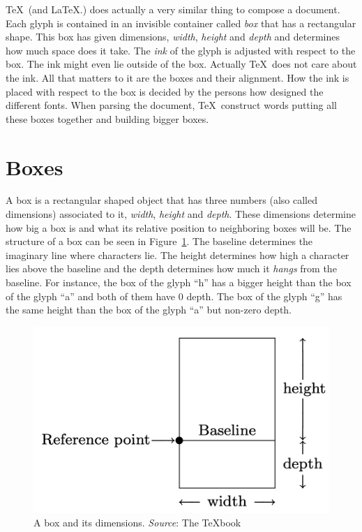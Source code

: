\documentclass[a4paper]{article}
\begin{document}
\TeX\ (and \LaTeX{}.) does actually a very similar thing to compose a document. Each glyph is contained in an invisible container called \emph{box} that has a rectangular shape. This box has given dimensions, \emph{width}, \emph{height} and \emph{depth} and determines how much space does it take. The \emph{ink} of the glyph is adjusted with respect to the box. The ink might even lie outside of the box. Actually \TeX\ does not care about the ink. All that matters to it are the boxes and their alignment. How the ink is placed with respect to the box is decided by the persons how designed the different fonts. When parsing the document, \TeX\ construct words putting all these boxes together and building bigger boxes. 

\section{Boxes}

A box is a rectangular shaped object that has three numbers (also called dimensions) associated to it, \emph{width}, \emph{height} and \emph{depth}. These dimensions determine how big a box is and what its relative position to neighboring boxes will be.  The structure of a box can be seen in Figure~\ref{fig:box}. The baseline determines the imaginary line where characters lie. The height determines how high a character lies above the baseline and the depth determines how much it \emph{hangs} from the baseline. For instance, the box of the glyph ``h'' has a bigger height than the box of the glyph ``a'' and both of them have 0 depth. The box of the glyph ``g'' has the same height than the box of the glyph ``a'' but non-zero depth.
%
\begin{figure}[h]
  \hfil\includegraphics[width=.7\textwidth]{glympse_figures/box.png}\hfil
  \caption{A box and its dimensions. \emph{Source}: The \TeX{}book \cite{Knuth1990}\label{fig:box}}
\end{figure}
\end{document}
